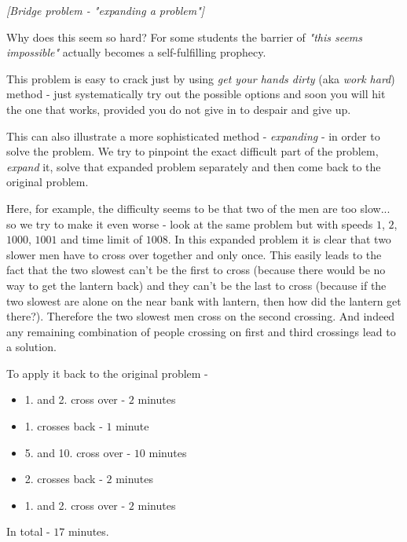 

%
%

\renewcommand{\theenumi}{\alph{enumi}}


\noindent 

\begin{problem}
\textit{[Bridge problem - "expanding a problem"]}

Why does this seem so hard? For some students the barrier of \textit{"this seems impossible"} actually becomes a self-fulfilling prophecy.

This problem is easy to crack just by using \textit{get your hands dirty} (aka \textit{work hard}) method - just systematically try out the possible options and soon you will hit the one that works, provided you do not give in to despair and give up.

This can also illustrate a more sophisticated  method - \textit{expanding} - in order to solve the problem. We try to pinpoint the exact difficult part of the problem, \textit{expand} it,  solve that expanded problem separately and then come back to the original problem.

Here, for example, the difficulty seems to be that two of the men are too slow... so we try to make it even worse - look at the same problem but with speeds $1$, $2$, $1000$, $1001$ and time limit of $1008$. In this expanded problem it is clear that two slower men have to cross over together and only once.  This easily leads to the fact that the two slowest can't be the first to cross (because there would be no way to get the lantern back) and they can't be the last to cross (because if the two slowest are alone on the near bank with lantern, then how did the lantern get there?).  Therefore the two slowest men cross on the second crossing. And indeed any remaining combination of people crossing on first and third crossings lead to a solution.

To apply it back to the original problem - 
\begin{itemize}
\item 1. and 2. cross over - $2$ minutes 
\item 1. crosses back - $1$ minute 
\item 5. and 10. cross over - $10$ minutes
\item 2. crosses back - $2$ minutes 
\item 1. and 2. cross over - $2$ minutes 
\end{itemize}
In total - $17$ minutes.
\end{problem}
